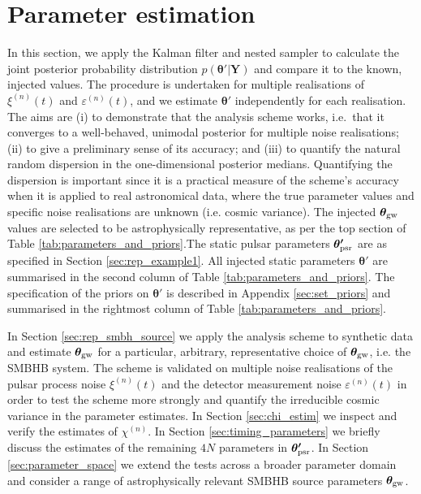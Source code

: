 \documentclass[fleqn,usenatbib,useAMS]{mnras}
\begin{document}
 
\section{Parameter estimation} \label{sec:pe_and_ms} 
In this section, we apply the Kalman filter and nested sampler to calculate the joint posterior probability distribution $p({\boldsymbol{\theta'}} | {\boldsymbol{Y}})$ and compare it to the known, injected values. The procedure is undertaken for multiple realisations of $\xi^{(n)}(t)$ and $\varepsilon^{(n)}(t)$, and we estimate $\boldsymbol{\theta'}$ independently for each realisation. The aims are (i) to demonstrate that the analysis scheme works, i.e.\ that it converges to a well-behaved, unimodal posterior for multiple noise realisations; (ii) to give a preliminary sense of its accuracy; and (iii) to quantify the natural random dispersion in the one-dimensional posterior medians. Quantifying the dispersion is important since it is a practical measure of the scheme's accuracy when it is applied to real astronomical data, where the true parameter values and specific noise realisations are unknown (i.e. cosmic variance). The injected $\boldsymbol{\theta}_{\rm gw}$ values are selected to be astrophysically representative, as per the top section of Table \ref{tab:parameters_and_priors}.The static pulsar parameters $\boldsymbol{\theta'}_{\rm psr}$ are as specified in Section \ref{sec:rep_example1}. All injected static parameters $\boldsymbol{\theta}'$ are summarised in the second column of Table \ref{tab:parameters_and_priors}. The specification of the priors on $\boldsymbol{\theta'}$ is described in Appendix \ref{sec:set_priors} and summarised in the rightmost column of Table \ref{tab:parameters_and_priors}. \newline 

In Section \ref{sec:rep_smbh_source} we apply the analysis scheme to synthetic data and estimate $\boldsymbol{\theta}_{\rm gw}$ for a  particular, arbitrary, representative choice of $\boldsymbol{\theta}_{\rm gw}$, i.e. the SMBHB system. The scheme is validated on multiple noise realisations of the pulsar process noise $\xi^{(n)}(t)$ and the detector measurement noise $\varepsilon^{(n)}(t)$ in order to test the scheme more strongly and quantify the  irreducible cosmic variance in the parameter estimates. In Section \ref{sec:chi_estim} we inspect and verify the estimates of  $\chi^{(n)}$. In Section \ref{sec:timing_parameters} we briefly discuss the estimates of the remaining $4N$ parameters in $\boldsymbol{\theta'}_{\rm psr}$. In Section \ref{sec:parameter_space} we extend the tests across a broader parameter domain and consider a range of astrophysically relevant SMBHB source parameters $\boldsymbol{\theta}_{\rm gw}$. 
\end{document}
